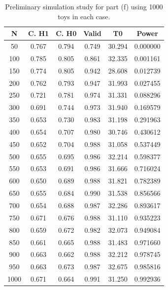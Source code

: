 \documentclass[12pt]{article}
\begin{document}
\begin{table}
    \centering
    \begin{tabular}{| c | c | c | c | c | c |}
        \hline
            N & C. H1 & C. H0 & Valid & T0     & Power    \\
        \hline
           50 & 0.767 & 0.794 & 0.749 & 30.294 & 0.000000 \\
        \hline
          100 & 0.785 & 0.805 & 0.861 & 32.335 & 0.001161 \\
        \hline
          150 & 0.774 & 0.805 & 0.942 & 28.608 & 0.012739 \\
        \hline
          200 & 0.762 & 0.793 & 0.947 & 31.993 & 0.027455 \\
        \hline
          250 & 0.721 & 0.781 & 0.974 & 31.331 & 0.088296 \\
        \hline
          300 & 0.691 & 0.744 & 0.973 & 31.940 & 0.169579 \\
        \hline
          350 & 0.653 & 0.730 & 0.983 & 31.198 & 0.291963 \\
        \hline
          400 & 0.654 & 0.707 & 0.980 & 30.746 & 0.430612 \\
        \hline
          450 & 0.652 & 0.704 & 0.988 & 31.058 & 0.537449 \\
        \hline
          500 & 0.655 & 0.695 & 0.986 & 32.214 & 0.598377 \\
        \hline
          550 & 0.653 & 0.691 & 0.986 & 31.666 & 0.716024 \\
        \hline
          600 & 0.650 & 0.689 & 0.988 & 31.821 & 0.782389 \\
        \hline
          650 & 0.655 & 0.684 & 0.990 & 31.538 & 0.856566 \\
        \hline
          700 & 0.654 & 0.688 & 0.987 & 32.286 & 0.893617 \\
        \hline
          750 & 0.671 & 0.676 & 0.988 & 31.110 & 0.935223 \\
        \hline
          800 & 0.659 & 0.672 & 0.982 & 32.073 & 0.949084 \\
        \hline
          850 & 0.661 & 0.665 & 0.988 & 31.483 & 0.971660 \\
        \hline
          900 & 0.663 & 0.662 & 0.988 & 32.212 & 0.978745 \\
        \hline
          950 & 0.663 & 0.673 & 0.987 & 32.675 & 0.985816 \\
        \hline
         1000 & 0.671 & 0.664 & 0.991 & 31.250 & 0.992936 \\
        \hline
\end{tabular}
\caption{Preliminary simulation study for part (f) using 1000 toys in each case.}
\label{tab_f_1}
\end{table}
\end{document}
